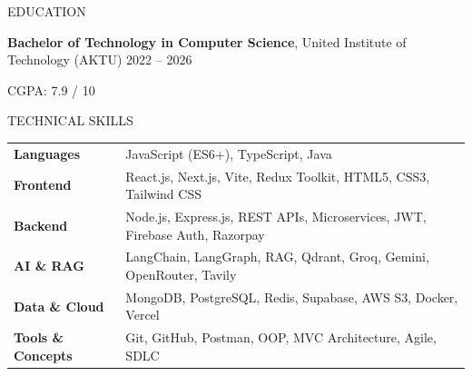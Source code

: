 \documentclass{resume}
\begin{document}
\begin{rSection}{EDUCATION}

\textbf{Bachelor of Technology in Computer Science}, United Institute of Technology (AKTU)
\hfill 2022 -- 2026

CGPA: 7.9 / 10

\end{rSection}


\begin{rSection}{TECHNICAL SKILLS}

\begin{tabular}{@{}l@{\hspace{1em}}l@{}}
\textbf{Languages} & JavaScript (ES6+), TypeScript, Java \\
\textbf{Frontend} & React.js, Next.js, Vite, Redux Toolkit, HTML5, CSS3, Tailwind CSS \\
\textbf{Backend} & Node.js, Express.js, REST APIs, Microservices, JWT, Firebase Auth, Razorpay \\
\textbf{AI \& RAG} & LangChain, LangGraph, RAG, Qdrant, Groq, Gemini, OpenRouter, Tavily \\
\textbf{Data \& Cloud} & MongoDB, PostgreSQL, Redis, Supabase, AWS S3, Docker, Vercel \\
\textbf{Tools \& Concepts} & Git, GitHub, Postman, OOP, MVC Architecture, Agile, SDLC \\
\end{tabular}

\end{rSection}
\end{document}
